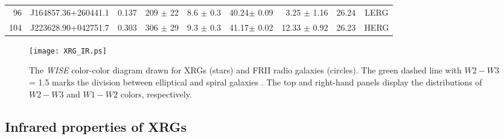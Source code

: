 \documentclass[twocolumn]{aastex62}
\begin{document}
\begin{table*}
\begin{minipage}{180mm}
{\begin{tabular}{@{} r c r r r r r c  c @{}}
96& J164857.36+260441.1 &    0.137& 209 $\pm$  22&       8.6 $\pm$     0.3 &    40.24$\pm$      0.09 &     3.25 $\pm$     1.16&26.24&  LERG\\
104&J223628.90+042751.7 &    0.303& 306 $\pm$  29&       9.3 $\pm$     0.3 &    41.17$\pm$      0.02 &    12.33 $\pm$     0.92&26.23&  HERG\\                 
\hline               
 \end{tabular}       
}
 \end{minipage}
 \end{table*}  
     

\begin{figure}
\centering
\texttt{[image: XRG\_IR.ps]}
\caption{The {\it WISE} color-color diagram drawn for XRGs (stars) and FRII radio 
galaxies (circles). The green dashed line with $W2-W3$ = 1.5 marks the 
division between elliptical and spiral galaxies
 \citep{Wright2010AJ....140.1868W}. The top and right-hand panels display
the distributions of $W2-W3$ and $W1-W2$ colors, respectively.}
\label{fig:xrg_wise}
 \end{figure}


\subsection{Infrared properties of XRGs}
\end{document}
